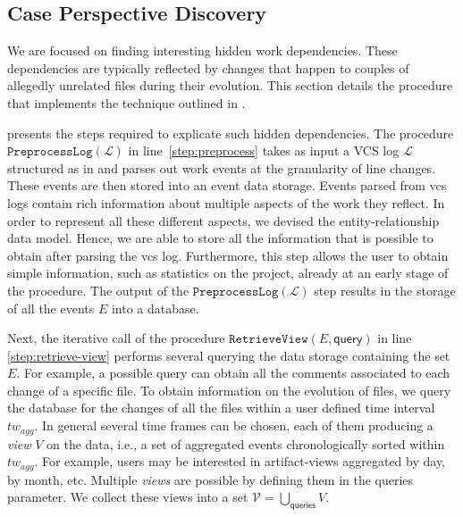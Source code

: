 \subsection{Case Perspective Discovery}

We are focused on finding interesting hidden work dependencies. These dependencies are typically reflected by changes that happen to couples of allegedly unrelated files during their evolution. This section details the procedure that implements the technique outlined in .

 presents the steps required to explicate such hidden dependencies. The procedure $\mathtt{PreprocessLog(\mathcal{L})}$ in line~\ref{step:preprocess} takes as input a VCS log $\mathcal{L}$ structured as in  and parses out work events at the granularity of line changes. These events are then stored into an event data storage. Events parsed from \gls{vcs} logs contain rich information about multiple aspects of the work they reflect. In order to represent all these different aspects, we devised the entity-relationship data model. Hence, we are able to store all the information that is possible to obtain after parsing the \gls{vcs} log. Furthermore, this step allows the user to obtain simple information, such as statistics on the project, already at an early stage of the procedure. The output of the $\mathtt{PreprocessLog(\mathcal{L})}$ step results in the storage of all the events $E$ into a database.



Next, the iterative call of the procedure $\mathtt{RetrieveView(\mathit{E}, \mathsf{query})}$ in line \ref{step:retrieve-view} performs several querying the data storage containing the set $E$. For example, a possible query can obtain all the comments associated to each change of a specific file. To obtain information on the evolution of files, we query the database for the changes of all the files within a user defined time interval $tw_{agg}$. In general several time frames can be chosen, each of them producing a \emph{view} $V$ on the data, i.e., a set of aggregated events chronologically sorted within $tw_{agg}$. For example, users may be interested in artifact-views aggregated by day, by month, etc. Multiple \emph{views} are possible by defining them in the {\textsf{queries}} parameter. We collect these views into a set $\mathcal{V} = \bigcup_{\textsf{queries}} V$. 

